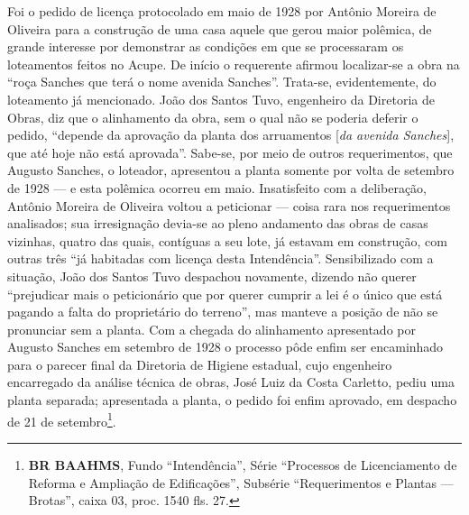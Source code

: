Foi o pedido de licença protocolado em maio de 1928 por Antônio Moreira de Oliveira para a construção de uma casa aquele que gerou maior polêmica, de grande interesse por demonstrar as condições em que se processaram os loteamentos feitos no Acupe. De início o requerente afirmou localizar-se a obra na ``roça Sanches que terá o nome avenida Sanches''. Trata-se, evidentemente, do loteamento já mencionado. João dos Santos Tuvo, engenheiro da Diretoria de Obras, diz que o alinhamento da obra, sem o qual não se poderia deferir o pedido, ``depende da aprovação da planta dos arruamentos [\textit{da avenida Sanches}], que até hoje não está aprovada''. Sabe-se, por meio de outros requerimentos, que Augusto Sanches, o loteador, apresentou a planta somente por volta de setembro de 1928 --- e esta polêmica ocorreu em maio. Insatisfeito com a deliberação, Antônio Moreira de Oliveira voltou a peticionar --- coisa rara nos requerimentos analisados; sua irresignação devia-se ao pleno andamento das obras de casas vizinhas, quatro das quais, contíguas a seu lote, já estavam em construção, com outras três ``já habitadas com licença desta Intendência''. Sensibilizado com a situação, João dos Santos Tuvo despachou novamente, dizendo não querer ``prejudicar mais o peticionário que por querer cumprir a lei é o único que está pagando a falta do proprietário do terreno'', mas manteve a posição de não se pronunciar sem a planta. Com a chegada do alinhamento apresentado por Augusto Sanches em setembro de 1928 o processo pôde enfim ser encaminhado para o parecer final da Diretoria de Higiene estadual, cujo engenheiro encarregado da análise técnica de obras, José Luiz da Costa Carletto, pediu uma planta separada; apresentada a planta, o pedido foi enfim aprovado, em despacho de 21 de setembro\footnote{\textbf{BR BAAHMS}, Fundo ``Intendência'', Série ``Processos de Licenciamento de Reforma e Ampliação de Edificações'', Subsérie ``Requerimentos e Plantas --- Brotas'', caixa 03, proc. 1540 fls. 27.}. 

